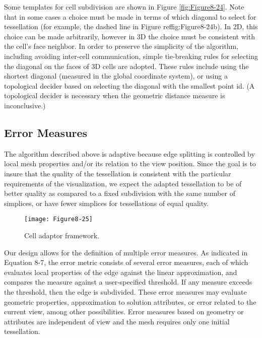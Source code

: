 Some templates for cell subdivision are shown in Figure \ref{fig:Figure8-24}. Note that in some cases a choice must be made in terms of which diagonal to select for tessellation (for example, the dashed line in Figure ref{fig:Figure8-24b}). In 2D, this choice can be made arbitrarily, however in 3D the choice must be consistent with the cell's face neighbor. In order to preserve the simplicity of the algorithm, including avoiding inter-cell communication, simple tie-breaking rules for selecting the diagonal on the faces of 3D cells are adopted. These rules include using the shortest diagonal (measured in the global coordinate system), or using a topological decider based on selecting the diagonal with the smallest point id. (A topological decider is necessary when the geometric distance measure is inconclusive.)

\subsection{Error Measures}

The algorithm described above is adaptive because edge splitting is controlled by local mesh properties and/or its relation to the view position. Since the goal is to insure that the quality of the tessellation is consistent with the particular requirements of the visualization, we expect the adapted tessellation to be of better quality as compared to a fixed subdivision with the same number of simplices, or have fewer simplices for tessellations of equal quality.

\begin{wrapfigure}{R}{0.4\textwidth}
	\centering
	\texttt{[image: Figure8-25]}
	\caption{Cell adaptor framework.}
	\label{fig:Figure8-25}
\end{wrapfigure}

Our design allows for the definition of multiple error measures. As indicated in Equation 8-7, the error metric consists of several error measures, each of which evaluates local properties of the edge against the linear approximation, and compares the measure against a user-specified threshold. If any measure exceeds the threshold, then the edge is subdivided. These error measures may evaluate geometric properties, approximation to solution attributes, or error related to the current view, among other possibilities. Error measures based on geometry or attributes are independent of view and the mesh requires only one initial tessellation.

